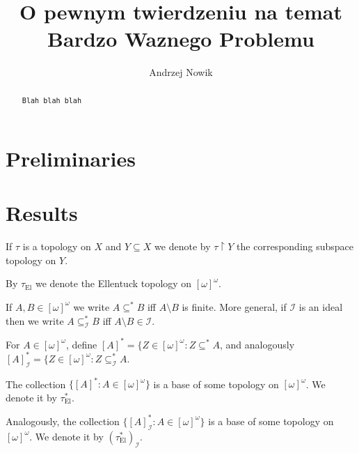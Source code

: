 \documentclass[12pt]{amsart}
\author{Andrzej Nowik}
\theoremstyle{plain}
\theoremstyle{definition}
\theoremstyle{remark}
\newcommand{\dummy}{{\tt Blah blah blah}}
\newcommand{\infsub}{[\omega]^{\omega}}
\newcommand{\calI}{\mathcal{I}}
\newcommand{\EllentuckTopology}{\tau_\mathrm{El}}
\newcommand{\EllentuckTopologyStar}{\EllentuckTopology^*}
\newcommand{\EllentuckTopologyStarIdeal}{(\EllentuckTopologyStar)_{\calI}}
\begin{document}
\title[
O pewnym twierdzeniu...
]{
O pewnym twierdzeniu na temat Bardzo Waznego Problemu
}

\begin{abstract}
\dummy
\end{abstract}

\maketitle

\section{Preliminaries}

\section{Results}


If $\tau$ is a topology on $X$ and $Y \subseteq X$ 
we denote by $\tau \restriction Y$ the corresponding subspace topology on $Y$.

By $\EllentuckTopology$ we denote the Ellentuck topology on $\infsub$.

If $A,B \in \infsub$ we write $A \subseteq^* B$ iff $A \setminus B$ is finite.
More general, if $\calI$ is an ideal then we write
$A \subseteq^*_{\calI} B$ iff $A \setminus B \in \calI$.

For $A \in \infsub$, define
$[A]^* = \lbrace Z \in \infsub\colon Z \subseteq^* A$,
and analogously
$[A]^*_{\calI} = \lbrace Z \in \infsub\colon Z \subseteq^*_{\calI} A$.

The collection $\lbrace [A]^*\colon A \in \infsub\rbrace$
is a base of some topology on $\infsub$. We denote
it by $\EllentuckTopologyStar$.

Analogously, the collection $\lbrace [A]^*_{\calI} \colon A \in \infsub\rbrace$
is a base of some topology on $\infsub$. We denote
it by $\EllentuckTopologyStarIdeal$.
\end{document}
